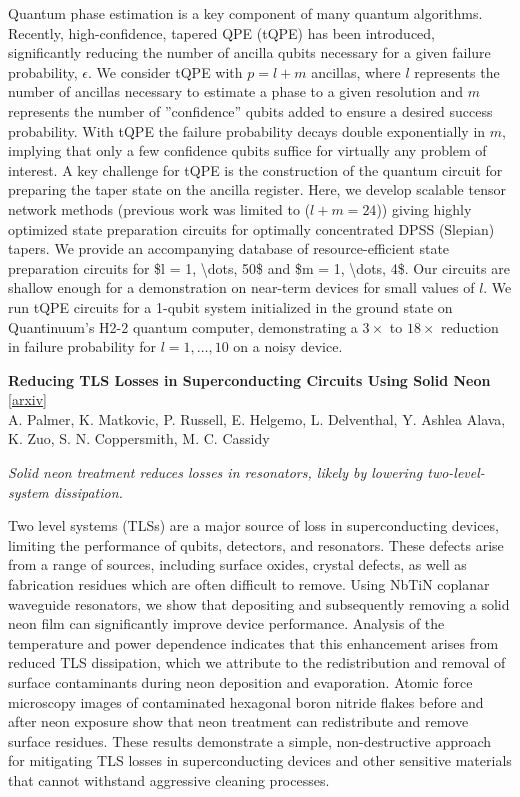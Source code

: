 \documentclass[12pt,letterpaper]{article}
\begin{document}
{\footnotesize Quantum phase estimation is a key component of many quantum algorithms. Recently, high-confidence, tapered QPE (tQPE) has been introduced, significantly reducing the number of ancilla qubits necessary for a given failure probability, $\epsilon$. We consider tQPE with $p = l+m$ ancillas, where $l$ represents the number of ancillas necessary to estimate a phase to a given resolution and $m$ represents the number of ''confidence'' qubits added to ensure a desired success probability. With tQPE the failure probability decays double exponentially in $m$, implying that only a few confidence qubits suffice for virtually any problem of interest. A key challenge for tQPE is the construction of the quantum circuit for preparing the taper state on the ancilla register. Here, we develop scalable tensor network methods (previous work was limited to ($l + m = 24$)) giving highly optimized state preparation circuits for optimally concentrated DPSS (Slepian) tapers. We provide an accompanying database of resource-efficient state preparation circuits for \$l = 1, \textbackslash{}dots, 50\$ and \$m = 1, \textbackslash{}dots, 4\$. Our circuits are shallow enough for a demonstration on near-term devices for small values of $l$. We run tQPE circuits for a 1-qubit system initialized in the ground state on Quantinuum's H2-2 quantum computer, demonstrating a $3\times$ to $18\times$ reduction in failure probability for $l=1,\ldots,10$ on a noisy device.\par}
\medskip
{\small\textbf{Reducing TLS Losses in Superconducting Circuits Using Solid Neon}} {\scriptsize[\href{https://arxiv.org/abs/2611.15021}{arxiv}]}\nopagebreak\\
{\scriptsize A. Palmer, K. Matkovic, P. Russell, E. Helgemo, L. Delventhal, Y. Ashlea Alava, K. Zuo, S. N. Coppersmith, M. C. Cassidy}\nopagebreak\\[2pt]
{\footnotesize\textit{Solid neon treatment reduces losses in resonators, likely by lowering two-level-system dissipation.}\par}\nopagebreak
{\footnotesize Two level systems (TLSs) are a major source of loss in superconducting devices, limiting the performance of qubits, detectors, and resonators. These defects arise from a range of sources, including surface oxides, crystal defects, as well as fabrication residues which are often difficult to remove. Using NbTiN coplanar waveguide resonators, we show that depositing and subsequently removing a solid neon film can significantly improve device performance. Analysis of the temperature and power dependence indicates that this enhancement arises from reduced TLS dissipation, which we attribute to the redistribution and removal of surface contaminants during neon deposition and evaporation. Atomic force microscopy images of contaminated hexagonal boron nitride flakes before and after neon exposure show that neon treatment can redistribute and remove surface residues. These results demonstrate a simple, non-destructive approach for mitigating TLS losses in superconducting devices and other sensitive materials that cannot withstand aggressive cleaning processes.\par}
\end{document}
